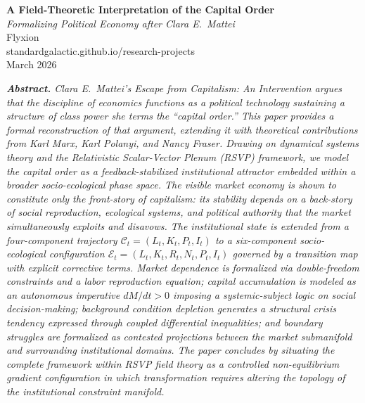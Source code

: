 \documentclass[12pt,a4paper]{article}
\theoremstyle{definition}
\theoremstyle{remark}
\begin{document}
\begin{titlepage}
  \begin{center}
    \vspace*{2cm}
    {\LARGE\bfseries A Field-Theoretic Interpretation of the Capital Order}\\[1.2em]
    {\large\itshape Formalizing Political Economy after Clara E.\ Mattei}\\[2.5em]
    {\normalsize Flyxion}\\[0.4em]
    {\small standardgalactic.github.io/research-projects}\\[3em]
    {\small March 2026}\\[4em]
    \begin{minipage}{0.78\textwidth}
      \small\itshape
      \textbf{Abstract.} Clara E.\ Mattei's \emph{Escape from Capitalism: An Intervention} argues that the discipline of economics functions as a political technology sustaining a structure of class power she terms the ``capital order.'' This paper provides a formal reconstruction of that argument, extending it with theoretical contributions from Karl Marx, Karl Polanyi, and Nancy Fraser. Drawing on dynamical systems theory and the Relativistic Scalar-Vector Plenum (RSVP) framework, we model the capital order as a feedback-stabilized institutional attractor embedded within a broader socio-ecological phase space. The visible market economy is shown to constitute only the \emph{front-story} of capitalism: its stability depends on a \emph{back-story} of social reproduction, ecological systems, and political authority that the market simultaneously exploits and disavows. The institutional state is extended from a four-component trajectory $\mathcal{C}_t = (L_t, K_t, P_t, I_t)$ to a six-component socio-ecological configuration $\mathcal{E}_t = (L_t, K_t, R_t, N_t, P_t, I_t)$ governed by a transition map with explicit corrective terms. Market dependence is formalized via double-freedom constraints and a labor reproduction equation; capital accumulation is modeled as an autonomous imperative $dM/dt > 0$ imposing a systemic-subject logic on social decision-making; background condition depletion generates a structural crisis tendency expressed through coupled differential inequalities; and boundary struggles are formalized as contested projections between the market submanifold and surrounding institutional domains. The paper concludes by situating the complete framework within RSVP field theory as a controlled non-equilibrium gradient configuration in which transformation requires altering the topology of the institutional constraint manifold.
    \end{minipage}
  \end{center}
\end{titlepage}
\end{document}
